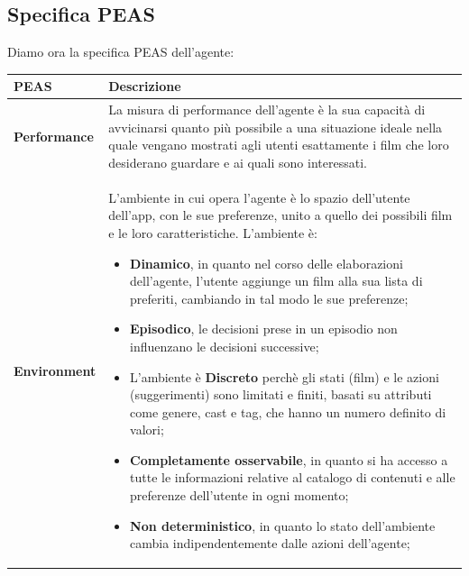 \documentclass[a4paper,12pt]{article}
\begin{document}
\subsection{Specifica PEAS}
Diamo ora la specifica PEAS dell'agente:
\begin{table}[h!]
    \centering
    \renewcommand{\arraystretch}{1.5} %
    \setlength{\tabcolsep}{8pt} %
    \begin{tabularx}{\textwidth}{|>{\columncolor[HTML]{CFE2F3}}l|X|}
        \hline
        \rowcolor[HTML]{CFE2F3} 
        \textbf{PEAS}              & \textbf{Descrizione}                                                                                                                                                                                                                                                                                         \\ \hline
        \textbf{Performance}       & La misura di performance dell'agente è la sua capacità di avvicinarsi quanto più possibile a una situazione ideale nella quale vengano mostrati agli utenti esattamente i film che loro desiderano guardare e ai quali sono interessati.                                                                                           				\\ \hline
        \textbf{Environment}       & L’ambiente in cui opera l’agente è lo spazio dell'utente dell'app, con le sue preferenze, unito a quello dei possibili film e le loro caratteristiche. L’ambiente è:
                            \begin{itemize}
                              \item \textbf{Dinamico}, in quanto nel corso delle elaborazioni dell’agente, l'utente aggiunge un film alla sua lista di preferiti, cambiando in tal modo le sue preferenze;
                              \item \textbf{Episodico}, le decisioni prese in un episodio non influenzano le decisioni successive;
			\item 	L'ambiente è \textbf{Discreto} perchè gli stati (film) e le azioni (suggerimenti) sono limitati e finiti, basati su attributi come genere, cast e tag, che hanno un numero definito di valori;
                              \item \textbf{Completamente osservabile}, in quanto si ha accesso a tutte le informazioni relative al catalogo di contenuti e alle preferenze dell'utente in ogni momento;
                              \item \textbf{Non deterministico}, in quanto lo stato dell’ambiente cambia indipendentemente dalle azioni dell’agente;

\end{itemize}
\end{tabularx}
\end{table}
\end{document}
